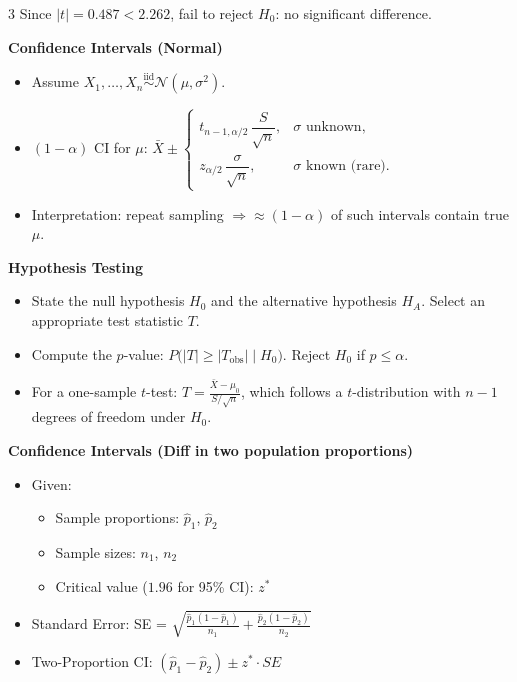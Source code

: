 \documentclass[10pt,landscape]{article}
\begin{document}
\begin{multicols}{3}
Since $|t| = 0.487 < 2.262$, fail to reject $H_0$: no significant difference.


\textbf{Confidence Intervals (Normal)}
\begin{itemize}
  \item Assume $X_1,\dots,X_n \overset{\text{iid}}{\sim} \mathcal{N}(\mu,\sigma^2)$.
  \item $(1-\alpha)$ CI for $\mu$: $\displaystyle \bar X \pm
    \begin{cases}
      t_{n-1,\alpha/2}\,\dfrac{S}{\sqrt{n}}, & \sigma\text{ unknown},\\[4pt]
      z_{\alpha/2}\,\dfrac{\sigma}{\sqrt{n}}, & \sigma\text{ known (rare).}
    \end{cases}$
  \item Interpretation: repeat sampling $\Rightarrow \approx(1-\alpha)$ of such intervals contain true $\mu$.
\end{itemize}

\textbf{Hypothesis Testing}
\begin{itemize}
  \item State the null hypothesis $H_0$ and the alternative hypothesis $H_A$. Select an appropriate test statistic $T$.
  \item Compute the $p$-value: $\displaystyle P\bigl(|T| \ge |T_{\mathrm{obs}}| \mid H_0\bigr)$. Reject $H_0$ if $p \le \alpha$.
  \item For a one-sample $t$-test: $\displaystyle T = \frac{\bar{X} - \mu_0}{S/\sqrt{n}}$, which follows a $t$-distribution with $n - 1$ degrees of freedom under $H_0$.
\end{itemize}

\textbf{Confidence Intervals (Diff in two population proportions)}
\begin{itemize}
\item Given: 
\begin{itemize}
  \item  Sample proportions: $\hat{p}_1$, $\hat{p}_2$
  \item  Sample sizes: $n_1$, $n_2$
  \item Critical value ($1.96$ for 95\% CI): $z^*$
\end{itemize}
  \item Standard Error: SE = $\sqrt{\frac{\hat{p}_1(1- \hat{p}_1)}{n_1} + \frac{\hat{p}_2(1-\hat{p}_2)}{n_2}}$
  \item Two-Proportion CI: $(\hat{p}_1 - \hat{p}_2) \pm z^* \cdot SE$
\end{itemize}



\end{multicols}
\end{document}
